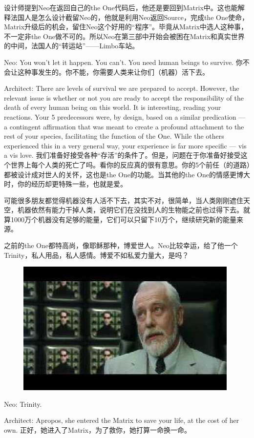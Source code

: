 \documentclass{ctexart}
\begin{document}
设计师提到Neo在返回自己的the One代码后，他还是要回到Matrix中。这也能解释法国人是怎么设计截留Neo的，他就是利用Neo返回Source，完成the One使命，Matrix升级后的机会，留住Neo这个好用的“程序”。毕竟从Matrix中选人这种事，不一定非the One做不可的。所以Neo在第三部中开始会被困在Matrix和真实世界的中间，法国人的“转运站”——Limbo车站。

Neo: You won't let it happen. You can't. You need human beings to survive. 你不会让这种事发生的。你不能，你需要人类来让你们（机器）活下去。

Architect: There are levels of survival we are prepared to accept. However, the relevant issue is whether or not you are ready to accept the responsibility of the death of every human being on this world. It is interesting, reading your reactions. Your 5 predecessors were, by design, based on a similar predication --- a contingent affirmation that was meant to create a profound attachment to the rest of your species, facilitating the function of the One. While the others experienced this in a very general way, your experience is far more specific --- vis a vis love. 我们准备好接受各种“存活”的条件了。但是，问题在于你准备好接受这个世界上每个人类的死亡了吗。看你的反应真的很有意思。你的5个前任（的道路）都被设计成对世人的关怀，这也是the One的功能。当其他的the One的情感更博大时，你的经历却更特殊一些，也就是爱。

可能很多朋友都觉得机器没有人活不下去，其实不对，很简单，当人类刚刚遮住天空，机器依然有能力干掉人类，说明它们在没找到人的生物能之前也过得下去。就算1000万个机器没有足够的能量，它们可以只留下10万个，继续研究新的能量来源。

之前的the One都特高尚，像耶稣那种，博爱世人。Neo比较幸运，给了他一个Trinity，私人用品，私人感情。博爱不如私爱力量大，是吗？

\begin{figure}[htb]
\centering
\includegraphics[width=0.5\linewidth]{fig/read_reloaded-165}
\end{figure}

Neo: Trinity.

Architect: Apropos, she entered the Matrix to save your life, at the cost of her own. 正好，她进入了Matrix，为了救你，她打算一命换一命。
\end{document}
